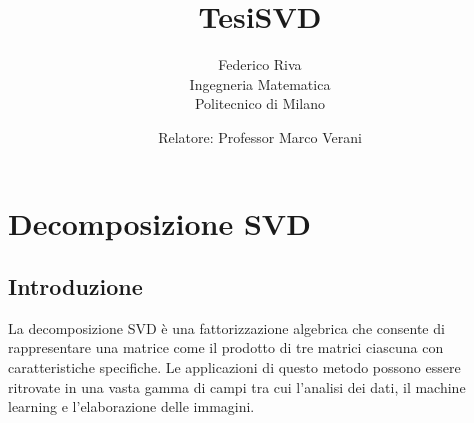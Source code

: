 \documentclass[11pt]{article}
\begin{document}
\title{Tesi}
\author{Federico Riva\\Ingegneria Matematica\\Politecnico di Milano}
\title{SVD}
\date{Relatore: Professor Marco Verani}

\maketitle
\newpage
\tableofcontents
\newpage
\section{Decomposizione SVD}
\subsection{Introduzione}
La decomposizione SVD è una fattorizzazione algebrica che consente di rappresentare una matrice come il prodotto di tre matrici ciascuna con caratteristiche specifiche. Le applicazioni di questo metodo possono essere ritrovate in una vasta gamma di campi tra cui l'analisi dei dati, il machine learning e l'elaborazione delle immagini.
\end{document}
